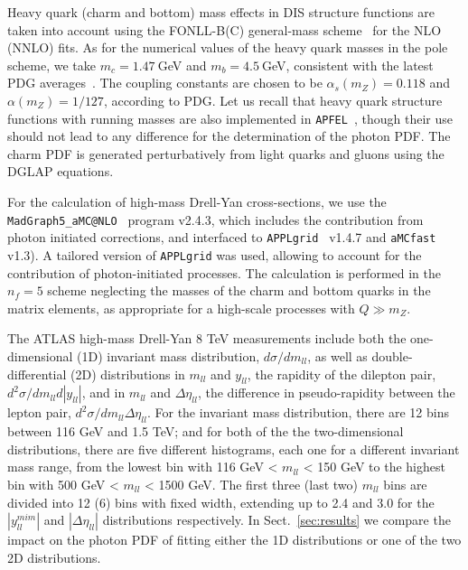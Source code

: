 Heavy quark (charm and bottom) mass effects in DIS structure functions are taken into account
using the FONLL-B(C) general-mass scheme~\cite{Forte:2010ta}
for the NLO (NNLO) fits.
%
As for the numerical values of the heavy quark masses in the pole scheme,
we take  $m_c=1.47~$GeV and $m_b=4.5~$GeV, consistent with the latest
PDG averages~\cite{Agashe:2014kda}.
%
The coupling constants are chosen to be  $\alpha_s(m_Z)=0.118$ and 
$\alpha(m_Z)=1/127$, according to PDG.
Let us recall that heavy quark structure functions with running masses
are also implemented in {\tt APFEL}~\cite{Bertone:2016ywq},
though their use should not lead to any difference for the determination of the photon PDF.
%
The charm PDF is generated perturbatively from light quarks and gluons using
the DGLAP equations.

For the calculation of high-mass Drell-Yan cross-sections,
we use the {\tt MadGraph5{\_}aMC@NLO}~\cite{Alwall:2014hca} program  v2.4.3,
which includes the contribution from photon initiated corrections,
and interfaced to {\tt APPLgrid}~\cite{Carli:2010rw} v1.4.7
and {\tt aMCfast}~\cite{amcfast} v1.3).
%
A tailored version of  {\tt APPLgrid} was used, allowing to account for
the contribution of photon-initiated processes.
%
The calculation is performed in the $n_f=5$ scheme neglecting the masses of the charm
and bottom quarks in the matrix elements, as appropriate for a high-scale processes
with $Q \gg m_Z$.

The ATLAS high-mass Drell-Yan 8 TeV measurements include both the one-dimensional (1D)
invariant mass distribution, $d\sigma/dm_{ll}$, as well as double-differential (2D)
distributions in $m_{ll}$ and $y_{ll}$, the rapidity of the dilepton pair,
$d^{2}\sigma/dm_{ll}d|y_{ll}|$, and in $m_{ll}$ and $\Delta\eta_{ll}$,
  the difference in 
  pseudo-rapidity between the lepton pair, $d^{2}\sigma/dm_{ll}\Delta\eta_{ll}$.
  For the invariant mass 
  distribution, there are 12 bins between 116 GeV and 1.5 TeV; and for both of the 
 the two-dimensional distributions, there are five different histograms, each one for a different invariant
 mass range, from the lowest bin
 with 116 GeV < $m_{ll}$ < 150 GeV to the highest bin with 500 GeV < $m_{ll}$ < 1500 GeV.
 The first three (last two) $m_{ll}$ bins are divided into 12 (6) bins with fixed
 width, extending up to 2.4 and 3.0 for the  $|y_{ll}^{mim}|$ and $|\Delta\eta_{ll}|$ distributions
 respectively.
 In Sect.~\ref{sec:results} we compare the impact on the photon PDF of fitting either
 the 1D distributions or one of the two 2D distributions.

